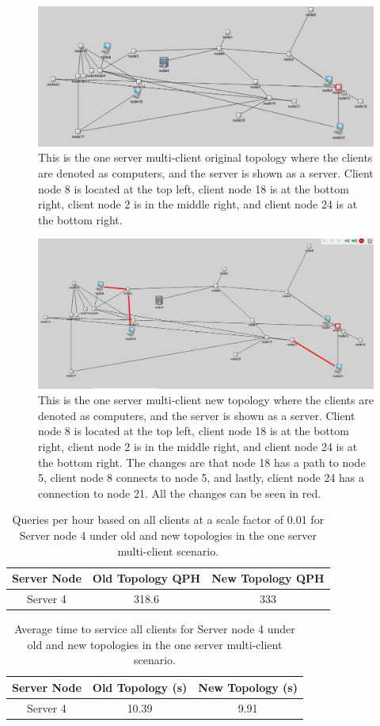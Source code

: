 \begin{figure}[tp]
\centering
\includegraphics[width=0.5 \textwidth]{figures/MultClientOrig}
\caption{This is the one server multi-client original topology where the clients are denoted as computers, and the server is shown as a server. Client node 8 is located at the top left, client node 18 is at the bottom right, client node 2 is in the middle right, and client node 24 is at the bottom right.
}
\end{figure}

\begin{figure}[tp]
\centering
\includegraphics[width=0.5 \textwidth]{figures/MultClientNew}
\caption{This is the one server multi-client new topology where the clients are denoted as computers, and the server is shown as a server. Client node 8 is located at the top left, client node 18 is at the bottom right, client node 2 is in the middle right, and client node 24 is at the bottom right. The changes are that node 18 has a path to node 5, client node 8 connects to node 5, and lastly, client node 24 has a connection to node 21. All the changes can be seen in red.}
\end{figure}

\begin{table}[h!]
\centering
\begin{tabular}{|c|c|c|}
\hline
Server Node & Old Topology QPH & New Topology QPH \\ \hline
Server 4 & 318.6 & 333 \\ \hline
\end{tabular}
\caption{Queries per hour based on all clients at a scale factor of 0.01 for Server node 4 under old and new topologies in the one server multi-client scenario.}
\label{tab:my_label}
\end{table}


\begin{table}[h!]
\centering
\begin{tabular}{|c|c|c|}
\hline
Server Node & Old Topology (s) & New Topology (s) \\ \hline
Server 4 & 10.39 & 9.91  \\ \hline
\end{tabular}
\caption{Average time to service all clients for Server node 4 under old and new topologies in the one server multi-client scenario.}
\label{tab:average_time}
\end{table}

